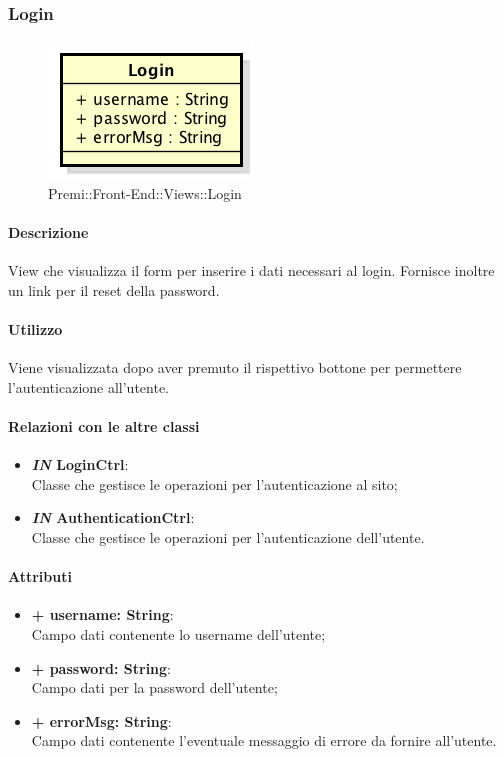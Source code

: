 	
\subsubsection{Login}
	\begin{figure}[h]
		\centering
		\includegraphics[width=0.3\linewidth]{img/premi_front_end_views_login}
		\caption[Premi::Front-End::Views::Login]{Premi::Front-End::Views::Login}
	\end{figure}
	
	\paragraph{Descrizione}
	View che visualizza il form per inserire i dati necessari al login. Fornisce inoltre un link per il reset della password.
	
	\paragraph{Utilizzo}
	Viene visualizzata dopo aver premuto il rispettivo bottone per permettere l'autenticazione all'utente.
	
	\paragraph{Relazioni con le altre classi}
	\begin{itemize}
		\item \textbf{\textit{IN} LoginCtrl}:\\
		Classe che gestisce le operazioni per l'autenticazione al sito;
		\item \textbf{\textit{IN} AuthenticationCtrl}:\\
		Classe che gestisce le operazioni per l'autenticazione dell'utente.
	\end{itemize}
	
	\paragraph{Attributi}
	\begin{itemize}
		\item \textbf{+ username: String}:\\
		Campo dati contenente lo username dell'utente;
		\item \textbf{+ password: String}:\\
		Campo dati per la password dell'utente;
		\item \textbf{+ errorMsg: String}:\\
		Campo dati contenente l'eventuale messaggio di errore da fornire all'utente.
	\end{itemize}
\newpage


